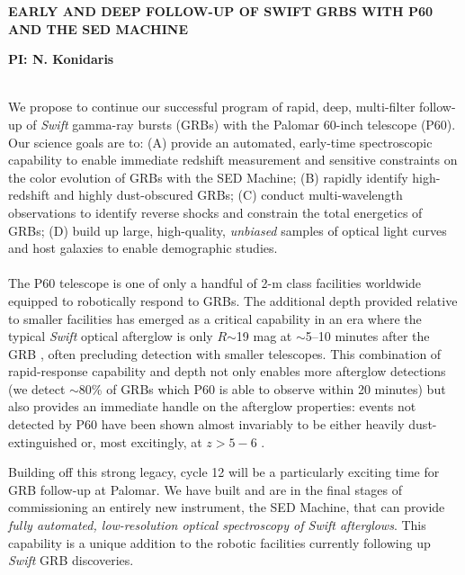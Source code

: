 \documentclass[letterpaper,11pt]{article}
\begin{document}
\pagestyle{plain}

\begin{center} 
\bfseries\uppercase{Early and Deep Follow-up of Swift GRBs with P60
and the SED Machine}
\end{center}
\vspace{-0.3cm}
\centerline{\bf PI: {N. Konidaris}}
 
\smallskip\\
We propose to continue our successful program of rapid, deep, multi-filter
follow-up of \textit{Swift} gamma-ray bursts (GRBs) with the Palomar 
60-inch telescope (P60).  Our science goals are to: (A) provide an automated, 
early-time spectroscopic capability to enable immediate redshift measurement 
and sensitive constraints on the color evolution of GRBs with the SED Machine;
(B) rapidly identify high-redshift and highly dust-obscured GRBs; (C) conduct 
multi-wavelength observations to identify reverse shocks and constrain the 
total energetics of GRBs; (D) build up large, high-quality, \textit{unbiased} 
samples of optical light curves and host galaxies to enable demographic 
studies. \\

\smallskip\\
The P60 telescope is one of only a handful of 2-m class facilities worldwide
equipped to robotically respond to GRBs.  The additional depth provided 
relative to smaller facilities has emerged as a critical capability in an 
era where the typical \textit{Swift} optical afterglow is only $R$$\sim$19 mag at 
$\sim$5--10 minutes after the GRB \citep{ckh+09,as+07}, often precluding 
detection with smaller telescopes.  This combination of rapid-response 
capability and depth not only enables more afterglow detections (we 
detect $\sim$80\% of GRBs which P60 is able to observe within 20 minutes) 
but also provides an immediate handle on the afterglow properties: events 
not detected by P60 have been shown almost invariably to be either heavily 
dust-extinguished or, most excitingly, at $z>5-6$ \citep{ckh+09,pcb+09}.

Building off this strong legacy, cycle 12 will be a particularly exciting
time for GRB follow-up at Palomar.  We have built and are in the final
stages of commissioning an entirely new instrument, the SED Machine,
that can provide \textit{fully automated, low-resolution optical spectroscopy
of Swift afterglows}.  This capability is a unique addition to the robotic
facilities currently following up \textit{Swift} GRB discoveries.
\end{document}
